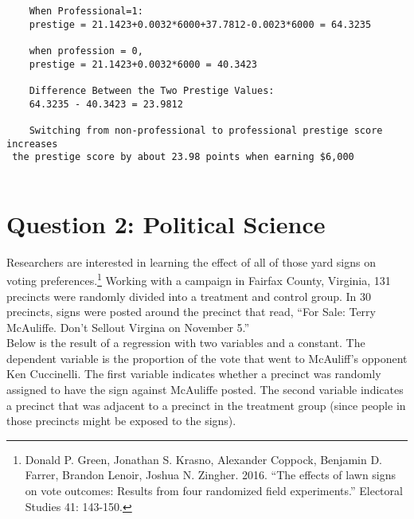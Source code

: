 \documentclass[12pt,letterpaper]{article}
\begin{document}
\begin{enumerate}
\begin{verbatim}
	When Professional=1:
	prestige = 21.1423+0.0032*6000+37.7812-0.0023*6000 = 64.3235
	
	when profession = 0,
	prestige = 21.1423+0.0032*6000 = 40.3423
	
	Difference Between the Two Prestige Values:
	64.3235 - 40.3423 = 23.9812
	
	Switching from non-professional to professional prestige score increases
 the prestige score by about 23.98 points when earning $6,000
	
\end{verbatim}
	
\end{enumerate}

\newpage

\section*{Question 2: Political Science}
\vspace{.25cm}
\noindent 	Researchers are interested in learning the effect of all of those yard signs on voting preferences.\footnote{Donald P. Green, Jonathan	S. Krasno, Alexander Coppock, Benjamin D. Farrer,	Brandon Lenoir, Joshua N. Zingher. 2016. ``The effects of lawn signs on vote outcomes: Results from four randomized field experiments.'' Electoral Studies 41: 143-150. } Working with a campaign in Fairfax County, Virginia, 131 precincts were randomly divided into a treatment and control group. In 30 precincts, signs were posted around the precinct that read, ``For Sale: Terry McAuliffe. Don't Sellout Virgina on November 5.'' \\

Below is the result of a regression with two variables and a constant.  The dependent variable is the proportion of the vote that went to McAuliff's opponent Ken Cuccinelli. The first variable indicates whether a precinct was randomly assigned to have the sign against McAuliffe posted. The second variable indicates
a precinct that was adjacent to a precinct in the treatment group (since people in those precincts might be exposed to the signs).  \\
\end{document}
